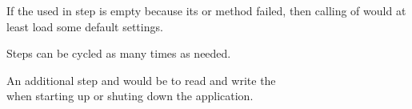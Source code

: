 If the  used in step  is empty because its  or  method failed, then calling  of  would at least load some default settings.

Steps  can be cycled as many times as needed.

An additional step  and  would be to read and write the \\ when starting up or shuting down the application.